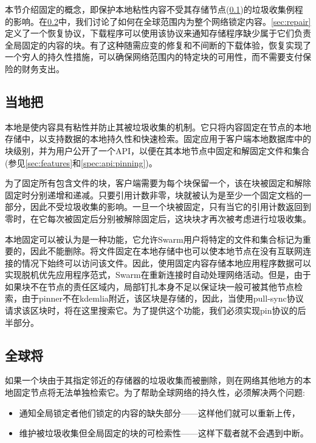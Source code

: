本节介绍固定的概念，即保护本地粘性内容不受其存储节点(\ref{sec:pinning})的垃圾收集例程的影响。在\ref{sec:global-pinning}中，我们讨论了如何在全球范围内为整个网络锁定内容。\ref{sec:repair}定义了一个恢复协议，下载程序可以使用该协议来通知存储程序缺少属于它们负责全局固定的内容的块。有了这种随需应变的修复和不间断的下载体验，恢复实现了一个穷人的持久性措施，可以确保网络范围内的特定块的可用性，而不需要支付保险的财务支出。

\subsection{当地把\statusgreen}\label{sec:pinning}

本地是使内容具有粘性并防止其被垃圾收集的机制。它只将内容固定在节点的本地存储中，以支持数据的本地持久性和快速检索。固定应用于客户端本地数据库中的块级别，并为用户公开了一个API，以便在其本地节点中固定和解固定文件和集合(参见\ref{sec:features}和\ref{spec:api:pinning})。

为了固定所有包含文件的块，客户端需要为每个块保留一个，该在块被固定和解除固定时分别递增和递减。只要引用计数非零，块就被认为是至少一个固定文档的一部分，因此不受垃圾收集的影响。一旦一个块被固定，只有当它的引用计数返回到零时，在它每次被固定后分别被解除固定后，这块块才再次被考虑进行垃圾收集。

本地固定可以被认为是一种功能，它允许Swarm用户将特定的文件和集合标记为重要的，因此不能删除。将文件固定在本地存储中也可以使本地节点在没有互联网连接的情况下始终可以访问该文件。因此，使用固定内容存储本地应用程序数据可以实现脱机优先应用程序范式，Swarm在重新连接时自动处理网络活动。但是，由于如果块不在节点的责任区域内，局部钉扎本身不足以保证块一般可被其他节点检索，由于pinner不在kdemlia附近，该区块是存储的，因此，当使用pull-sync协议请求该区块时，将在这里搜索它。为了提供这个功能，我们必须实现pin协议的后半部分。

\subsection{全球将}\label{sec:global-pinning}

如果一个块由于其指定邻近的存储器的垃圾收集而被删除，则在网络其他地方的本地固定节点将无法单独检索它。为了帮助全球网络的持久性，必须解决两个问题:

\begin{itemize}
    \item  通知全局锁定者他们锁定的内容的缺失部分——这样他们就可以重新上传，
    \item  维护被垃圾收集但全局固定的块的可检索性——这样下载者就不会遇到中断。 
\end{itemize}

